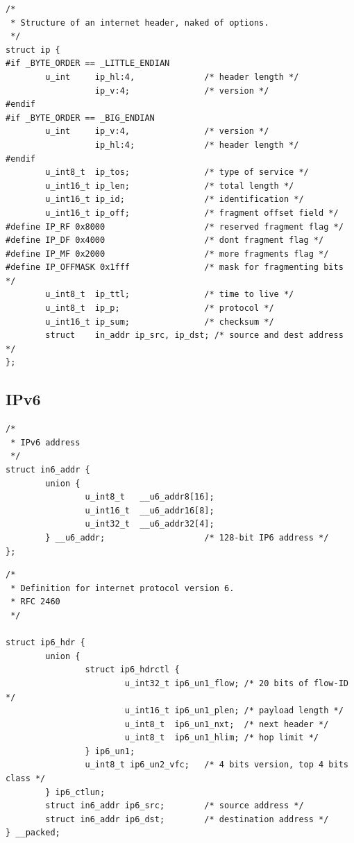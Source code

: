 \begin{lstlisting}[caption=IPv4ヘッダ定義 (/usr/include/netinet/ip.h),label=src:ip.h]
/*
 * Structure of an internet header, naked of options.
 */
struct ip {
#if _BYTE_ORDER == _LITTLE_ENDIAN
        u_int     ip_hl:4,              /* header length */
                  ip_v:4;               /* version */
#endif
#if _BYTE_ORDER == _BIG_ENDIAN
        u_int     ip_v:4,               /* version */
                  ip_hl:4;              /* header length */
#endif
        u_int8_t  ip_tos;               /* type of service */
        u_int16_t ip_len;               /* total length */
        u_int16_t ip_id;                /* identification */
        u_int16_t ip_off;               /* fragment offset field */
#define IP_RF 0x8000                    /* reserved fragment flag */
#define IP_DF 0x4000                    /* dont fragment flag */
#define IP_MF 0x2000                    /* more fragments flag */
#define IP_OFFMASK 0x1fff               /* mask for fragmenting bits */
        u_int8_t  ip_ttl;               /* time to live */
        u_int8_t  ip_p;                 /* protocol */
        u_int16_t ip_sum;               /* checksum */
        struct    in_addr ip_src, ip_dst; /* source and dest address */
};
\end{lstlisting}

\subsection{IPv6} \label{sec:ipv6}

\begin{lstlisting}[caption=IPv6アドレス構造体 (/usr/include/netinet6/in6.h),label=src:in6.h]
/*
 * IPv6 address
 */
struct in6_addr {
        union {
                u_int8_t   __u6_addr8[16];
                u_int16_t  __u6_addr16[8];
                u_int32_t  __u6_addr32[4];
        } __u6_addr;                    /* 128-bit IP6 address */
};
\end{lstlisting}

\begin{lstlisting}[caption=IPv6ヘッダ定義 (/usr/include/netinet/ip6.h),label=src:ip6.h]
/*
 * Definition for internet protocol version 6.
 * RFC 2460
 */

struct ip6_hdr {
        union {
                struct ip6_hdrctl {
                        u_int32_t ip6_un1_flow; /* 20 bits of flow-ID */
                        u_int16_t ip6_un1_plen; /* payload length */
                        u_int8_t  ip6_un1_nxt;  /* next header */
                        u_int8_t  ip6_un1_hlim; /* hop limit */
                } ip6_un1;
                u_int8_t ip6_un2_vfc;   /* 4 bits version, top 4 bits class */
        } ip6_ctlun;
        struct in6_addr ip6_src;        /* source address */
        struct in6_addr ip6_dst;        /* destination address */
} __packed;
\end{lstlisting}

